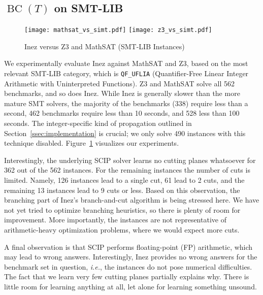 \documentclass{llncs}
\newcommand{\inez}[0]{\textsf{Inez}}
\newcommand{\comment}[1]{}
\newcommand{\ie}[0]{\emph{i.e.}, }
\newcommand{\eg}[0]{\emph{e.g.}, }
\newcommand{\bct}[0]{\ensuremath{\operatorname{BC}(T)}}
\begin{document}
\comment{SCIP performs floating-point arithmetic, and can thus provide
  wrong answers. \inez{} inherits this deficiency. For many applications,
  numerical inaccuracies are not a concern, \eg the noise in the model
  overshadows the floating point error intervals. \comment{or an
    answer close enough to the theoretical optimal suffices.}
  Floating-point arithmetic for linear programming is a well-studied
  trade-off. \bct{} can be laid out on top of an exact solver, if the
  application domain dictates accuracy.}

\subsection{\bct{} on SMT-LIB}

\begin{figure}[t]
\texttt{[image: mathsat\_vs\_simt.pdf]}
\texttt{[image: z3\_vs\_simt.pdf]}
\caption{\inez{} versus Z3 and MathSAT (SMT-LIB Instances)}
\label{fig:smtlib}
\end{figure}

We experimentally evaluate \inez{} against MathSAT and Z3, based on
the most relevant SMT-LIB category, which is \texttt{QF\_UFLIA}
(Quantifier-Free Linear Integer Arithmetic with Uninterpreted
Functions). Z3 and MathSAT solve all 562 benchmarks, and so does
\inez{}. While \inez{} is generally slower than the more mature SMT
solvers, the majority of the benchmarks (338) require less than a
second, 462 benchmarks require less than 10 seconds, and 528 less than
100 seconds. The integer-specific kind of propagation outlined in
Section~\ref{ssec:implementation} is crucial; we only solve 490
instances with this technique disabled.  Figure~\ref{fig:smtlib}
visualizes our experiments.

Interestingly, the underlying SCIP solver learns no cutting planes
whatsoever for 362 out of the 562 instances. For the remaining
instances the number of cuts is limited. Namely, 126 instances lead to
a single cut, 61 lead to 2 cuts, and the remaining 13 instances lead
to 9 cuts or less. Based on this observation, the branching part of
\inez{}'s branch-and-cut algorithm is being stressed here. We have
not yet tried to optimize branching heuristics, so there is plenty of
room for improvement. More importantly, the instances are not
representative of arithmetic-heavy optimization problems, where we
would expect more cuts.

A final observation is that SCIP performs floating-point (FP)
arithmetic, which may lead to wrong answers. Interestingly, \inez{}
provides no wrong answers for the benchmark set in question, \ie the
instances do not pose numerical difficulties. The fact that we learn
very few cutting planes partially explains why. There is little room
for learning anything at all, let alone for learning something
unsound.
\end{document}
